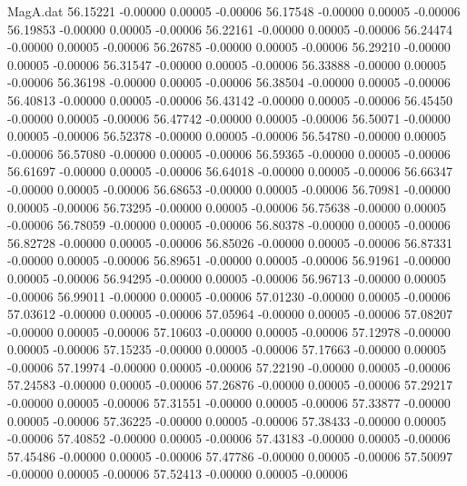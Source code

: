 \begin{filecontents}{MagA.dat}
  56.15221   -0.00000    0.00005   -0.00006
  56.17548   -0.00000    0.00005   -0.00006
  56.19853   -0.00000    0.00005   -0.00006
  56.22161   -0.00000    0.00005   -0.00006
  56.24474   -0.00000    0.00005   -0.00006
  56.26785   -0.00000    0.00005   -0.00006
  56.29210   -0.00000    0.00005   -0.00006
  56.31547   -0.00000    0.00005   -0.00006
  56.33888   -0.00000    0.00005   -0.00006
  56.36198   -0.00000    0.00005   -0.00006
  56.38504   -0.00000    0.00005   -0.00006
  56.40813   -0.00000    0.00005   -0.00006
  56.43142   -0.00000    0.00005   -0.00006
  56.45450   -0.00000    0.00005   -0.00006
  56.47742   -0.00000    0.00005   -0.00006
  56.50071   -0.00000    0.00005   -0.00006
  56.52378   -0.00000    0.00005   -0.00006
  56.54780   -0.00000    0.00005   -0.00006
  56.57080   -0.00000    0.00005   -0.00006
  56.59365   -0.00000    0.00005   -0.00006
  56.61697   -0.00000    0.00005   -0.00006
  56.64018   -0.00000    0.00005   -0.00006
  56.66347   -0.00000    0.00005   -0.00006
  56.68653   -0.00000    0.00005   -0.00006
  56.70981   -0.00000    0.00005   -0.00006
  56.73295   -0.00000    0.00005   -0.00006
  56.75638   -0.00000    0.00005   -0.00006
  56.78059   -0.00000    0.00005   -0.00006
  56.80378   -0.00000    0.00005   -0.00006
  56.82728   -0.00000    0.00005   -0.00006
  56.85026   -0.00000    0.00005   -0.00006
  56.87331   -0.00000    0.00005   -0.00006
  56.89651   -0.00000    0.00005   -0.00006
  56.91961   -0.00000    0.00005   -0.00006
  56.94295   -0.00000    0.00005   -0.00006
  56.96713   -0.00000    0.00005   -0.00006
  56.99011   -0.00000    0.00005   -0.00006
  57.01230   -0.00000    0.00005   -0.00006
  57.03612   -0.00000    0.00005   -0.00006
  57.05964   -0.00000    0.00005   -0.00006
  57.08207   -0.00000    0.00005   -0.00006
  57.10603   -0.00000    0.00005   -0.00006
  57.12978   -0.00000    0.00005   -0.00006
  57.15235   -0.00000    0.00005   -0.00006
  57.17663   -0.00000    0.00005   -0.00006
  57.19974   -0.00000    0.00005   -0.00006
  57.22190   -0.00000    0.00005   -0.00006
  57.24583   -0.00000    0.00005   -0.00006
  57.26876   -0.00000    0.00005   -0.00006
  57.29217   -0.00000    0.00005   -0.00006
  57.31551   -0.00000    0.00005   -0.00006
  57.33877   -0.00000    0.00005   -0.00006
  57.36225   -0.00000    0.00005   -0.00006
  57.38433   -0.00000    0.00005   -0.00006
  57.40852   -0.00000    0.00005   -0.00006
  57.43183   -0.00000    0.00005   -0.00006
  57.45486   -0.00000    0.00005   -0.00006
  57.47786   -0.00000    0.00005   -0.00006
  57.50097   -0.00000    0.00005   -0.00006
  57.52413   -0.00000    0.00005   -0.00006

\end{filecontents}

